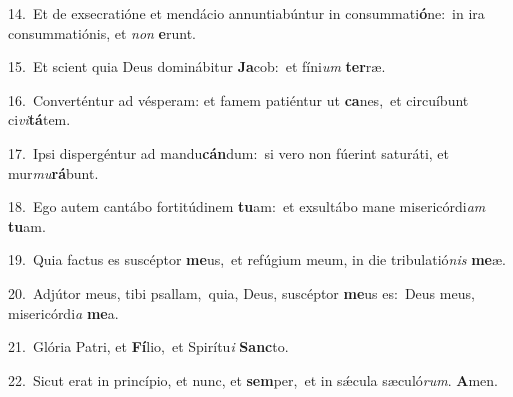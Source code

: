 {\numbfont\textcolor{\numbcolor}{14.}}~Et de exsecratióne et mendácio annuntiabúntur in consummati\-\textbf{ó}\-ne:~\star in ira consummatiónis, et \textit{non} \textbf{e}\-runt.\par
{\numbfont\textcolor{\numbcolor}{15.}}~Et scient quia Deus dominábitur \textbf{Ja}\-cob:~\star et fíni\textit{um} \textbf{ter}\-ræ.\par
{\numbfont\textcolor{\numbcolor}{16.}}~Converténtur ad vésperam: et famem patiéntur ut \textbf{ca}\-nes,~\star et circuíbunt ci\-\textit{vi}\-\textbf{tá}tem.\par
{\numbfont\textcolor{\numbcolor}{17.}}~Ipsi dispergéntur ad mandu\-\textbf{cán}\-dum:~\star si vero non fúerint saturáti, et mur\-\textit{mu}\-\textbf{rá}bunt.\par
{\numbfont\textcolor{\numbcolor}{18.}}~Ego autem cantábo fortitúdinem \textbf{tu}\-am:~\star et exsultábo mane misericórdi\textit{am} \textbf{tu}\-am.\par
{\numbfont\textcolor{\numbcolor}{19.}}~Quia factus es suscéptor \textbf{me}\-us,~\star et refúgium meum, in die tribulatió\textit{nis} \textbf{me}\-æ.\par
{\numbfont\textcolor{\numbcolor}{20.}}~Adjútor meus, tibi psallam,~\dagger quia, Deus, suscéptor \textbf{me}\-us es:~\star Deus meus, misericórdi\textit{a} \textbf{me}\-a.\par
{\numbfont\textcolor{\numbcolor}{21.}}~Glória Patri, et \textbf{Fí}\-lio,~\star et Spirítu\textit{i} \textbf{Sanc}\-to.\par
{\numbfont\textcolor{\numbcolor}{22.}}~Sicut erat in princípio, et nunc, et \textbf{sem}\-per,~\star et in sǽcula sæculó\-\textit{rum}\-. \textbf{A}\-men.\par
